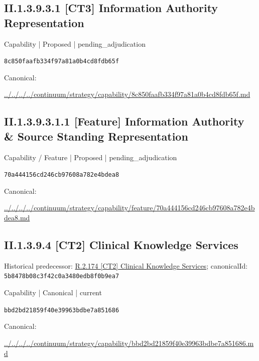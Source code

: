 \documentclass[10pt,a4paper]{article}
\begin{document}
\subsection*{II.1.3.9.3.1 [CT3] Information Authority Representation}
\label{element-8c850faafb334f97a81a0b4cd8fdb65f}
{\small Capability | Proposed | pending\_adjudication}\par
\texttt{8c850faafb334f97a81a0b4cd8fdb65f}\par
Canonical: \par
{\footnotesize\url{../../../../continuum/strategy/capability/8c850faafb334f97a81a0b4cd8fdb65f.md}}\par
\subsection*{II.1.3.9.3.1.1 [Feature] Information Authority \& Source Standing Representation}
\label{element-70a444156cd246cb97608a782e4bdea8}
{\small Capability / Feature | Proposed | pending\_adjudication}\par
\texttt{70a444156cd246cb97608a782e4bdea8}\par
Canonical: \par
{\footnotesize\url{../../../../continuum/strategy/capability/feature/70a444156cd246cb97608a782e4bdea8.md}}\par
\subsection*{II.1.3.9.4 [CT2] Clinical Knowledge Services}
Historical predecessor: \hyperref[element-5b8478b08c3f42c0a3480edb8f0b9ea7]{R.2.174 [CT2] Clinical Knowledge Services}; canonicalId: \texttt{5b8478b08c3f42c0a3480edb8f0b9ea7}\par
\label{element-bbd2bd21859f40e39963bdbe7a851686}
{\small Capability | Canonical | current}\par
\texttt{bbd2bd21859f40e39963bdbe7a851686}\par
Canonical: \par
{\footnotesize\url{../../../../continuum/strategy/capability/bbd2bd21859f40e39963bdbe7a851686.md}}\par
\end{document}
